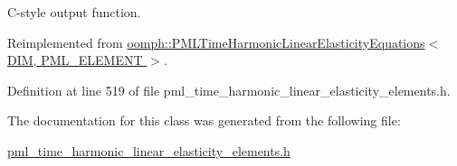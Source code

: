 C-\/style output function. 



Reimplemented from \hyperlink{classoomph_1_1PMLTimeHarmonicLinearElasticityEquations_a27d100b419a9dfde06275bd3c3c73681}{oomph\+::\+P\+M\+L\+Time\+Harmonic\+Linear\+Elasticity\+Equations$<$ D\+I\+M, P\+M\+L\+\_\+\+E\+L\+E\+M\+E\+N\+T $>$}.



Definition at line 519 of file pml\+\_\+time\+\_\+harmonic\+\_\+linear\+\_\+elasticity\+\_\+elements.\+h.



The documentation for this class was generated from the following file\+:\begin{DoxyCompactItemize}
\item 
\hyperlink{pml__time__harmonic__linear__elasticity__elements_8h}{pml\+\_\+time\+\_\+harmonic\+\_\+linear\+\_\+elasticity\+\_\+elements.\+h}\end{DoxyCompactItemize}
